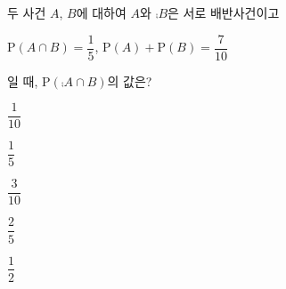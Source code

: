 두 사건 $A$, $B$에 대하여 $A$와 $\comp{B}$은 서로 배반사건이고\par\smallskip\noindent\hspace*{1.5em}$\mathrm{P}(A\cap B)=\dfrac{1}{5}$, $\mathrm{P}(A)+\mathrm{P}(B)=\dfrac{7}{10}$\par\smallskip\noindent 일 때, $\mathrm{P}(\comp{A}\cap B)$의 값은? 
\begin{choices32}{\rule[-3ex]{0pt}{8ex}$\dfrac{1}{10}$}{\rule[-3ex]{0pt}{8ex}$\dfrac{1}{5}$}{\rule[-3ex]{0pt}{8ex}$\dfrac{3}{10}$}{\rule[-3ex]{0pt}{8ex}$\dfrac{2}{5}$}{\rule[-3ex]{0pt}{8ex}$\dfrac{1}{2}$}\end{choices32}
